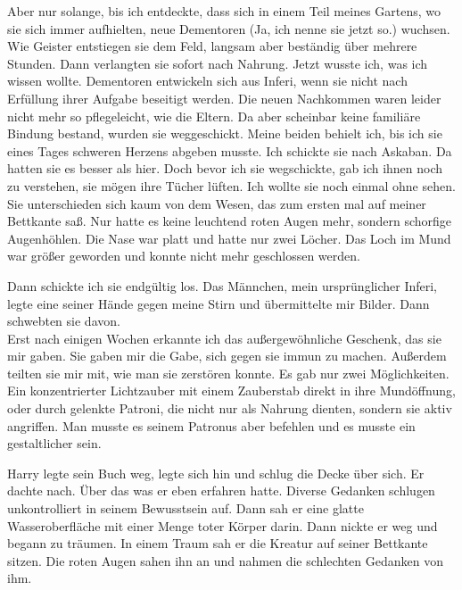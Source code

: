 \begin{buch}
Aber nur solange, bis ich entdeckte, dass sich in einem Teil meines Gartens, wo sie sich immer aufhielten, neue Dementoren (Ja, ich nenne sie jetzt so.) wuchsen. Wie Geister entstiegen sie dem Feld, langsam aber beständig über mehrere Stunden. Dann verlangten sie sofort nach Nahrung. Jetzt wusste ich, was ich wissen wollte. Dementoren entwickeln sich aus Inferi, wenn sie nicht nach Erfüllung ihrer Aufgabe beseitigt werden. Die neuen Nachkommen waren leider nicht mehr so pflegeleicht, wie die Eltern. Da aber scheinbar keine familiäre Bindung bestand, wurden sie weggeschickt. Meine beiden behielt ich, bis ich sie eines Tages schweren Herzens abgeben musste. Ich schickte sie nach Askaban. Da hatten sie es besser als hier. Doch bevor ich sie wegschickte, gab ich ihnen noch zu verstehen, sie mögen ihre Tücher lüften. Ich wollte sie noch einmal ohne sehen. Sie unterschieden sich kaum von dem Wesen, das zum ersten mal auf meiner Bettkante saß. Nur hatte es keine leuchtend roten Augen mehr, sondern schorfige Augenhöhlen. Die Nase war platt und hatte nur zwei Löcher. Das Loch im Mund war größer geworden und konnte nicht mehr geschlossen werden.

Dann schickte ich sie endgültig los. Das Männchen, mein ursprünglicher Inferi, legte eine seiner Hände gegen meine Stirn und übermittelte mir Bilder. Dann schwebten sie davon.\\
Erst nach einigen Wochen erkannte ich das außergewöhnliche Geschenk, das sie mir gaben. Sie gaben mir die Gabe, sich gegen sie immun zu machen. Außerdem teilten sie mir mit, wie man sie zerstören konnte. Es gab nur zwei Möglichkeiten. Ein konzentrierter Lichtzauber mit einem Zauberstab direkt in ihre Mundöffnung, oder durch gelenkte Patroni, die nicht nur als Nahrung dienten, sondern sie aktiv angriffen. Man musste es seinem Patronus aber befehlen und es musste ein gestaltlicher sein.
\end{buch}

Harry legte sein Buch weg, legte sich hin und schlug die Decke über sich. Er dachte nach. Über das was er eben erfahren hatte. Diverse Gedanken schlugen unkontrolliert in seinem Bewusstsein auf.  Dann sah er eine glatte Wasseroberfläche mit einer Menge toter Körper darin.  Dann nickte er weg und begann zu träumen. In einem Traum sah er die Kreatur auf seiner Bettkante sitzen. Die roten Augen sahen ihn an und nahmen die schlechten Gedanken von ihm.

\trenn

